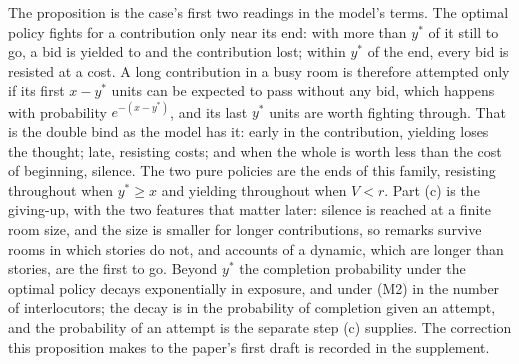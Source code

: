 The proposition is the case's first two readings in the model's terms. The optimal policy fights for a contribution only near its end: with more than $y^{*}$ of it still to go, a bid is yielded to and the contribution lost; within $y^{*}$ of the end, every bid is resisted at a cost. A long contribution in a busy room is therefore attempted only if its first $x - y^{*}$ units can be expected to pass without any bid, which happens with probability $e^{-(x - y^{*})}$, and its last $y^{*}$ units are worth fighting through. That is the double bind as the model has it: early in the contribution, yielding loses the thought; late, resisting costs; and when the whole is worth less than the cost of beginning, silence. The two pure policies are the ends of this family, resisting throughout when $y^{*} \ge x$ and yielding throughout when $V < r$. Part (c) is the giving-up, with the two features that matter later: silence is reached at a finite room size, and the size is smaller for longer contributions, so remarks survive rooms in which stories do not, and accounts of a dynamic, which are longer than stories, are the first to go. Beyond $y^{*}$ the completion probability under the optimal policy decays exponentially in exposure, and under (M2) in the number of interlocutors; the decay is in the probability of completion given an attempt, and the probability of an attempt is the separate step (c) supplies. The correction this proposition makes to the paper's first draft is recorded in the supplement.

